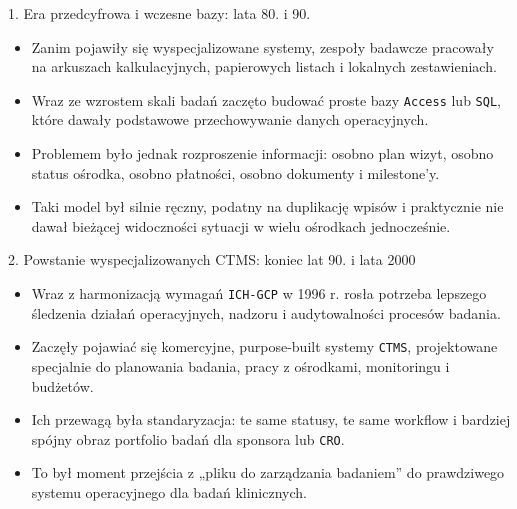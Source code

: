 \begin{frame}{1. Era przedcyfrowa i wczesne bazy: lata 80. i 90.}
  \begin{itemize}
    \item Zanim pojawiły się wyspecjalizowane systemy, zespoły badawcze pracowały na arkuszach kalkulacyjnych, papierowych listach i lokalnych zestawieniach.
    \item Wraz ze wzrostem skali badań zaczęto budować proste bazy \texttt{Access} lub \texttt{SQL}, które dawały podstawowe przechowywanie danych operacyjnych.
    \item Problemem było jednak rozproszenie informacji: osobno plan wizyt, osobno status ośrodka, osobno płatności, osobno dokumenty i milestone'y.
    \item Taki model był silnie ręczny, podatny na duplikację wpisów i praktycznie nie dawał bieżącej widoczności sytuacji w wielu ośrodkach jednocześnie.
  \end{itemize}
\end{frame}

\begin{frame}{2. Powstanie wyspecjalizowanych CTMS: koniec lat 90. i lata 2000}
  \begin{itemize}
    \item Wraz z harmonizacją wymagań \texttt{ICH-GCP} w 1996 r. rosła potrzeba lepszego śledzenia działań operacyjnych, nadzoru i audytowalności procesów badania.
    \item Zaczęły pojawiać się komercyjne, purpose-built systemy \texttt{CTMS}, projektowane specjalnie do planowania badania, pracy z ośrodkami, monitoringu i budżetów.
    \item Ich przewagą była standaryzacja: te same statusy, te same workflow i bardziej spójny obraz portfolio badań dla sponsora lub \texttt{CRO}.
    \item To był moment przejścia z „pliku do zarządzania badaniem” do prawdziwego systemu operacyjnego dla badań klinicznych.
  \end{itemize}
\end{frame}

